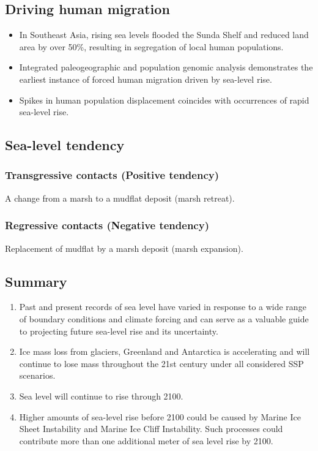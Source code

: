 \documentclass[11pt]{article}
\begin{document}
\subsection{Driving human migration}
\label{sec:orgcb46a48}
\begin{itemize}
\item In Southeast Asia, rising sea levels flooded the Sunda Shelf and reduced land area by over 50\%, resulting in segregation of local human populations.
\item Integrated paleogeographic and population genomic analysis demonstrates the earliest instance of forced human migration driven by sea-level rise.
\item Spikes in human population displacement coincides with occurrences of rapid sea-level rise.
\end{itemize}

\subsection{Sea-level tendency}
\label{sec:orgd6d6f79}

\subsubsection{Transgressive contacts (Positive tendency)}
\label{sec:org0251f7d}
A change from a marsh to a mudflat deposit (marsh retreat).

\subsubsection{Regressive contacts (Negative tendency)}
\label{sec:orgf67212c}
Replacement of mudflat by a marsh deposit (marsh expansion).

\subsection{Summary}
\label{sec:org05440c3}
\begin{enumerate}
\item Past and present records of sea level have varied in response to a wide range of boundary conditions and climate forcing and can serve as a valuable guide to projecting future sea-level rise and its uncertainty.
\item Ice mass loss from glaciers, Greenland and Antarctica is accelerating and will continue to lose mass throughout the 21st century under all considered SSP scenarios.
\item Sea level will continue to rise through 2100.
\item Higher amounts of sea-level rise before 2100 could be caused by Marine Ice Sheet Instability and Marine Ice Cliff Instability. Such processes could contribute more than one additional meter of sea level rise by 2100.
\end{enumerate}
\end{document}
